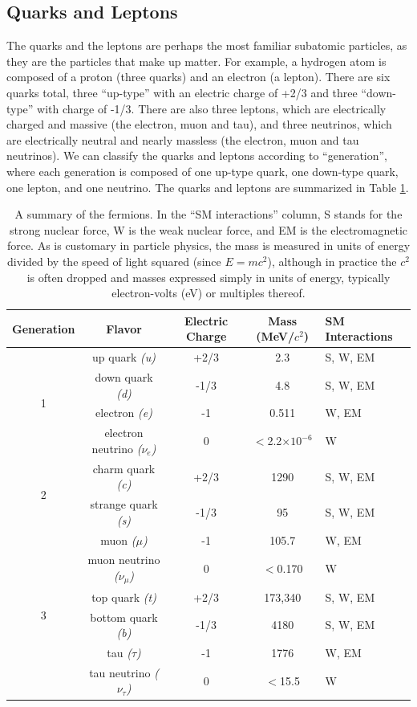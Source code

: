 \subsection{Quarks and Leptons}
The quarks and the leptons are perhaps the most familiar subatomic particles, as they 
are the particles that make up matter.  For example, a hydrogen atom is 
composed of a proton (three quarks) and an electron (a lepton).  
There are six quarks total, three ``up-type'' with an electric 
charge of +2/3 and three ``down-type'' with charge 
of -1/3.  There are also three leptons, which are electrically 
charged and massive (the electron, muon and tau), and three neutrinos, 
which are electrically neutral and nearly massless (the electron, muon and tau neutrinos).  
We can classify the quarks and leptons according to ``generation'', where each generation 
is composed of one up-type quark, one down-type quark, 
one lepton, and one neutrino.  The quarks and leptons are summarized in Table \ref{tab:QLTable}.

\begin{table}
	\caption{A summary of the fermions.  In the ``SM interactions'' column, 
    S stands for the strong nuclear force, W is the weak nuclear force, 
    and EM is the electromagnetic force.  As is customary in particle physics, 
    the mass is measured in units of energy divided by the speed of light squared 
    (since $E=mc^2$), although in practice the $c^2$ is often 
    dropped and masses expressed simply in units of energy, typically electron-volts (eV) or multiples thereof. 	\label{tab:QLTable}}
	\begin{tabular}{| c || c | c | c | p{2cm} |}
		\hline
		Generation &  Flavor & Electric Charge & Mass (MeV/$c^2$) & SM Interactions\\
		\hline
		\multirow{4}{*}{1} & up quark \it{(u)} & +2/3 & 2.3 & S, W, EM\\
		    & down quark \it{(d)} & -1/3 & 4.8 & S, W, EM\\
		    & electron \it{(e)}& -1 & 0.511 & W, EM \\
		    & electron neutrino \it{($\nu_{e}$)} & 0 & $<$2.2$\times 10^{-6}$ & W\\
		\hline
		\multirow{2}{*}{2} & charm quark \it{(c)} & +2/3 & 1290 &  S, W, EM \\
		    & strange quark \it{(s)} & -1/3 & 95 & S, W, EM \\
		    & muon \it{($\mu$)} & -1& 105.7 & W, EM \\
		    & muon neutrino \it{($\nu_{\mu}$)} & 0 & $<$0.170 & W \\
		\hline 
		\multirow{2}{*}{3} & top quark \it{(t)} & +2/3 & 173,340 & S, W, EM \\
		    & bottom quark \it{(b)} & -1/3  & 4180 & S, W, EM \\ 
		    & tau \it{($\tau$)} & -1 & 1776 & W, EM\\
		    & tau neutrino \it{($\nu_{\tau}$)} & 0 & $<$15.5 & W\\		    
		\hline
	\end{tabular}
\end{table}


